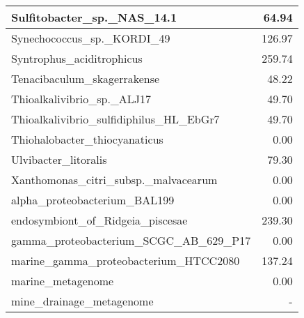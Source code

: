 \documentclass[12pt,a4paper]{article}
\begin{document}
\begin{table}[ht]
\begin{center}
\begin{tabular}{|l*{1}{|r}|}
Sulfitobacter\_sp.\_NAS\_14.1 & 64.94 \\ \hline
Synechococcus\_sp.\_KORDI\_49 & 126.97 \\ \hline
Syntrophus\_aciditrophicus & 259.74 \\ \hline
Tenacibaculum\_skagerrakense & 48.22 \\ \hline
Thioalkalivibrio\_sp.\_ALJ17 & 49.70 \\ \hline
Thioalkalivibrio\_sulfidiphilus\_HL\_EbGr7 & 49.70 \\ \hline
Thiohalobacter\_thiocyanaticus & 0.00 \\ \hline
Ulvibacter\_litoralis & 79.30 \\ \hline
Xanthomonas\_citri\_subsp.\_malvacearum & 0.00 \\ \hline
alpha\_proteobacterium\_BAL199 & 0.00 \\ \hline
endosymbiont\_of\_Ridgeia\_piscesae & 239.30 \\ \hline
gamma\_proteobacterium\_SCGC\_AB\_629\_P17 & 0.00 \\ \hline
marine\_gamma\_proteobacterium\_HTCC2080 & 137.24 \\ \hline
marine\_metagenome & 0.00 \\ \hline
mine\_drainage\_metagenome & - \\ \hline
\end{tabular}
\end{center}
\end{table}
\end{document}
